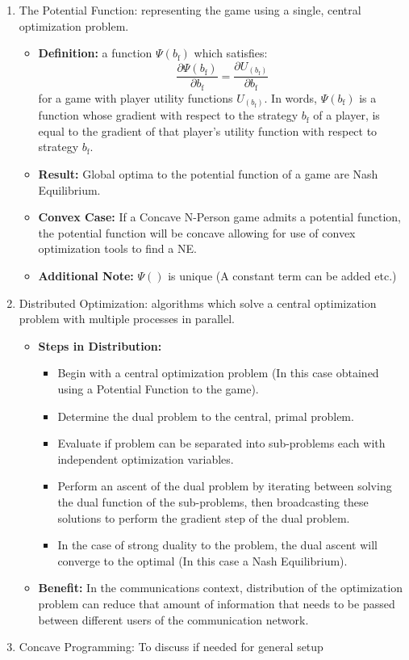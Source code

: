 \documentclass[12pt,a4paper]{report}
\begin{document}
\begin{enumerate}
\begin{itemize}
\end{itemize}
\item The Potential Function: representing the game using a single, central optimization problem.
\begin{itemize}
\item
\textbf{Definition:}  a function
$ \Psi(b_{\text{f}})$ which satisfies:
\begin{equation}\label{potential_game_condition}
\frac{\partial \Psi(b_{\text{f}})}{\partial b_{\text{f}}}
 =
 \frac{\partial U_(b_{\text{f}})}{\partial b_{\text{f}}}
\end{equation} 
for a game with player utility functions $U_(b_{\text{f}})$.
In words, $ \Psi(b_{\text{f}})$ is a function whose gradient with respect to the strategy $b_{\text{f}}$ of a player, is equal to the gradient of that player's utility function with respect to strategy $b_{\text{f}}$.
\item \textbf{Result:} Global optima to the potential function of a game are Nash Equilibrium.
\item \textbf{Convex Case:} If a Concave N-Person game admits a potential function, the potential function will be concave allowing for use of convex optimization tools to find a NE. 
\item \textbf{Additional Note:}  $ \Psi() $ is unique (A constant term can be added etc.)
\end{itemize}



\item Distributed Optimization: algorithms which solve a central optimization problem with multiple processes in parallel. 
\begin{itemize}
\item \textbf{Steps in Distribution:} 
\begin{itemize}
\item Begin with a central optimization problem (In this case obtained using a Potential Function to the game).
\item Determine the dual problem to the central, primal problem.
\item Evaluate if problem can be separated into sub-problems each with independent optimization variables.
\item Perform an ascent of the dual problem by iterating between solving the dual function of the sub-problems, then broadcasting these solutions to perform the gradient step of the dual problem.
\item In the case of strong duality to the problem, the dual ascent will converge to the optimal (In this case a Nash Equilibrium).

\end{itemize} 
\item \textbf{Benefit:} In the communications context, distribution of the optimization problem can reduce that amount of information that needs to be passed between different users of the communication network. 
\end{itemize}
\item Concave Programming: To discuss if needed for general setup


\end{enumerate}
\end{document}

